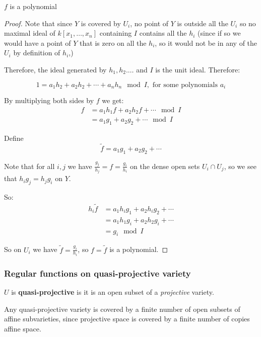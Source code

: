 \begin{proposition}
    $f$ is a polynomial

\begin{proof}
    
Note that since $Y$ is covered by $U_i$, no point of $Y$ is outside all the $U_i$ so no maximal ideal of $k[x_1,\dots,x_n]$ containing $I$ contains all the $h_i$ (since if so we would have a point of $Y$ that is zero on all the $h_i$, so it would not be in any of the $U_i$ by definition of $h_i$,)

Therefore, the ideal generated by $h_1,h_2.\dots$ and $I$ is the unit ideal. Therefore:

\[1 = a_1h_2+a_2h_2+\cdots+{a_n}h_n \mod I, \text{ for some polynomials }a_i\]

By multiplying both sides by $f$ we get:\begin{align*}
    f &= a_1h_1f + a_2h_2f +\cdots \mod I\\
      &= a_1g_1 + a_2g_2+\cdots \mod I 
\end{align*}

Define \[\tilde{f} = a_1g_1 + a_2g_2+\cdots\]

Note that for all $i,j$ we have $\frac{g_j}{h_j} = f = \frac{g_i}{h_i}$  on the dense open sets $U_i\cap U_j$, so we see that ${h_i}{g_j} = {h_j}{g_i}$ on $Y$. 

So: \begin{align*}
    h_i\tilde{f} &= a_1{h_i}g_1 + a_2{h_i}g_2+\cdots\\
                 &= a_1{h_1}g_i + a_2{h_2}g_i+\cdots\\
                 &= g_i \mod I
\end{align*}

So on $U_i$ we have $\tilde{f} = \frac{g_i}{h_i}$, so $f = \tilde{f}$ is a polynomial.
\end{proof}
\end{proposition}

\subsubsection{Regular functions on quasi-projective variety}

\begin{definition}
    $U$ is \textbf{quasi-projective} is it is an open subset of a \textit{projective} variety.
\end{definition}

Any quasi-projective variety is covered by a finite number of open subsets of affine subvarieties, since projective space is covered by a finite number of copies affine space. 

